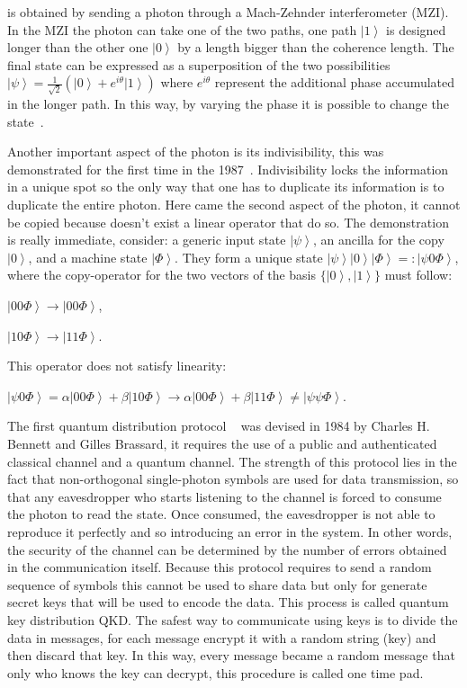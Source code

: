 is obtained by sending a photon through a Mach-Zehnder interferometer (MZI). In the MZI the photon can take one of the two paths, one path $\left|1\right>$ is designed longer than the other one $\left|0\right>$ by a length bigger than the coherence length. The final state can be expressed as a superposition of the two possibilities $\left|\psi\right> = \frac{1}{\sqrt{2}} (\left|0\right> + e^{i\theta}\left|1\right>)$ where $e^{i \theta}$ represent the additional phase accumulated in the longer path. In this way, by varying the phase it is possible to change the state~\cite{a22}.

Another important aspect of the photon is its indivisibility, this was demonstrated for the first time in the 1987~\cite{a23}. Indivisibility locks the information in a unique spot so the only way that one has to duplicate its information is to duplicate the entire photon. Here came the second aspect of the photon, it cannot be copied because doesn't exist a linear operator that do so. The demonstration is really immediate, consider: a generic input state $\left|\psi\right>$, an ancilla for the copy $\left|0\right>$, and a machine state $\left|\Phi\right>$. They form a unique state $\left|\psi\right>\left|0\right>\left|\Phi\right> =: \left|\psi 0 \Phi\right>$, where the copy-operator for the two vectors of the basis $\{\left|0\right>, \left|1\right>\}$ must follow:

$\left|0 0 \Phi\right> \to \left|0 0 \Phi\right>$,

$\left|1 0 \Phi\right> \to \left|1 1 \Phi\right>$.

This operator does not satisfy linearity:

$\left|\psi 0 \Phi\right> = \alpha\left|0 0 \Phi\right> + \beta\left|1 0 \Phi\right> \to \alpha\left|0 0 \Phi\right> + \beta\left|1 1 \Phi\right> \ne \left|\psi \psi \Phi\right>$.



The first quantum distribution protocol ~\cite{a9} was devised in 1984 by Charles H. Bennett and Gilles Brassard, it requires the use of a public and authenticated classical channel and a quantum channel. The strength of this protocol lies in the fact that non-orthogonal single-photon symbols are used for data transmission, so that any eavesdropper who starts listening to the channel is forced to consume the photon to read the state. Once consumed, the eavesdropper is not able to reproduce it perfectly and so introducing an error in the system. In other words, the security of the channel can be determined by the number of errors obtained in the communication itself. Because this protocol requires to send a random sequence of symbols this cannot be used to share data but only for generate secret keys that will be used to encode the data. This process is called quantum key distribution QKD. The safest way to communicate using keys is to divide the data in messages, for each message encrypt it with a random string (key) and then discard that key. In this way, every message became a random message that only who knows the key can decrypt, this procedure is called one time pad.

